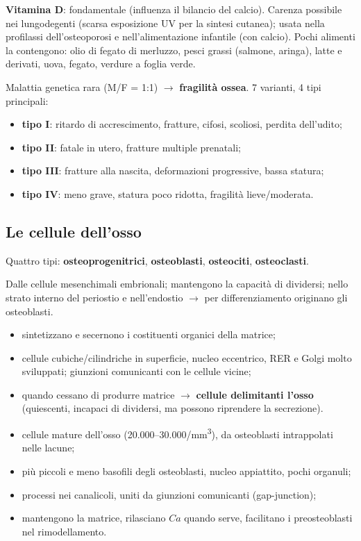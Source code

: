 \textbf{Vitamina D}: fondamentale (influenza il bilancio del calcio). Carenza possibile nei
lungodegenti (scarsa esposizione UV per la sintesi cutanea); usata nella profilassi
dell'osteoporosi e nell'alimentazione infantile (con calcio). Pochi alimenti la contengono: olio di
fegato di merluzzo, pesci grassi (salmone, aringa), latte e derivati, uova, fegato, verdure a
foglia verde.

Malattia genetica rara (M/F = 1:1) $\rightarrow$ \textbf{fragilità ossea}. 7 varianti, 4 tipi
principali:
\begin{itemize}
  \item \textbf{tipo I}: ritardo di accrescimento, fratture, cifosi, scoliosi, perdita dell'udito;
  \item \textbf{tipo II}: fatale in utero, fratture multiple prenatali;
  \item \textbf{tipo III}: fratture alla nascita, deformazioni progressive, bassa statura;
  \item \textbf{tipo IV}: meno grave, statura poco ridotta, fragilità lieve/moderata.
\end{itemize}

\subsection{Le cellule dell'osso}
Quattro tipi: \textbf{osteoprogenitrici}, \textbf{osteoblasti}, \textbf{osteociti},
\textbf{osteoclasti}.

Dalle cellule mesenchimali embrionali; mantengono la capacità di dividersi; nello strato interno
del periostio e nell'endostio $\rightarrow$ per differenziamento originano gli osteoblasti.

\begin{itemize}
  \item sintetizzano e secernono i costituenti organici della matrice;
  \item cellule cubiche/cilindriche in superficie, nucleo eccentrico, RER e Golgi molto sviluppati;
    giunzioni comunicanti con le cellule vicine;
  \item quando cessano di produrre matrice $\rightarrow$ \textbf{cellule delimitanti l'osso}
    (quiescenti, incapaci di dividersi, ma possono riprendere la secrezione).
\end{itemize}

\begin{itemize}
  \item cellule mature dell'osso (20.000--30.000/mm\textsuperscript{3}), da osteoblasti intrappolati
    nelle lacune;
  \item più piccoli e meno basofili degli osteoblasti, nucleo appiattito, pochi organuli;
  \item processi nei canalicoli, uniti da giunzioni comunicanti (gap-junction);
  \item mantengono la matrice, rilasciano $Ca$ quando serve, facilitano i preosteoblasti nel
    rimodellamento.
\end{itemize}

